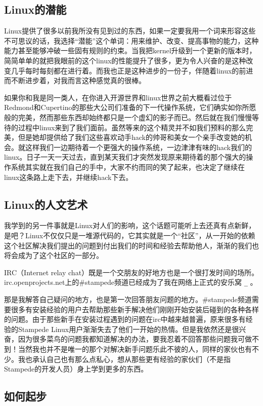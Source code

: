 \subsection{Linux的潜能}

Linux提供了很多以前我所没有见到过的东西，如果一定要我用一个词来形容这些不可思议的话，我选择“潜能”这个单词：用来维护、改变、提高事物的能力，这种能力甚至能够冲破一些固有规则的约束。当我把kernel升级到一个更新的版本时，简简单单的就把我眼前的这个linux的性能提升了很多，更为令人兴奋的是这种改变几乎每时每刻都在进行着。而我也正是这种进步的一份子，伴随着linux的前进而不断进步着，对我而言这种感觉真的很棒。

如果你和我是同一类人，在你进入开源世界和linux世界之前大概看过位于Redmond和Cupertino的那些大公司们准备的下一代操作系统，它们确实如你所愿般的完美，然而那些东西却始终都只是一个虚幻的影子而已。然后就在我们慢慢等待的过程中linux来到了我们面前。虽然等来的这个精灵并不如我们预料的那么完美，但是她却提供给了我们这些喜欢动手hack的帅哥和美女一个亲手改变她的机会。就这样我们一边期待着一个更强大的操作系统，一边津津有味的hack我们的linux。日子一天一天过去，直到某天我们才突然发现原来期待着的那个强大的操作系统其实就在我们自己的手中，大家不约而同的笑了起来，也决定了继续在linux这条路上走下去，并继续hack下去。

\subsection{Linux的人文艺术}

我学到的另一件事就是Linux对人们的影响，这个话题可能听上去还真有点新鲜，是吧？Linux不仅仅只是一堆源代码的，它其实就是一个“社区”，从一开始的依赖这个社区解决我们提出的问题到付出我们的时间和经验去帮助他人，渐渐的我们也将会成为了这个社区的一部分。

IRC（Internet relay chat）既是一个交朋友的好地方也是一个很打发时间的场所。irc.openprojects.net上的\#stampede频道已经成为了我在网络上正式的安乐窝
\verb ^_^  。

那是我解答自己疑问的地方，也是第一次回答朋友问题的地方。\#stampede频道需要很多有安装经验的用户去帮助那些新手解决他们刚刚开始安装后碰到的各种各样的问题。由于那些新手在安装过程遇到的问题在irc中越来越普遍，原来很多有经验的Stampede Linux用户渐渐失去了他们一开始的热情。但是我依然还是很兴奋，因为很多菜鸟的问题我都知道解决的办法，要我忍着不回答那些问题我可做不到！当然我也并不是唯一的那个对解决新手问题乐此不彼的人，同样的家伙也有不少。我也承认自己也有那么点私心，想从那些更有经验的家伙们（不是指Stampede的开发人员）身上学到更多的东西。

\subsection{如何起步}

